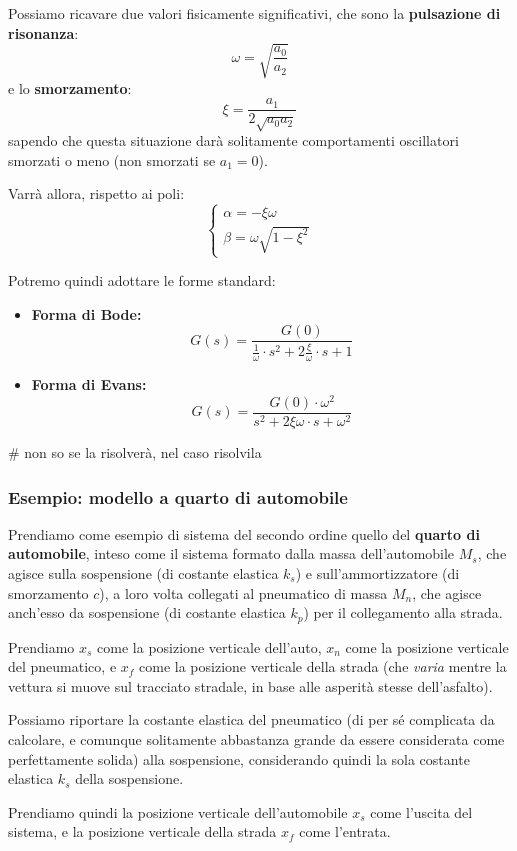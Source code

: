 \documentclass[a4paper,11pt]{article}
\begin{document}
Possiamo ricavare due valori fisicamente significativi, che sono la \textbf{pulsazione di risonanza}:
$$
\omega = \sqrt{\frac{a_0}{a_2}}
$$
e lo \textbf{smorzamento}:
$$
\xi = \frac{a_1}{2 \sqrt{a_0 a_2}}
$$
sapendo che questa situazione darà solitamente comportamenti oscillatori smorzati o meno (non smorzati se $a_1 = 0$).

Varrà allora, rispetto ai poli:
\[
	\begin{cases}
		\alpha = -\xi \omega \\
		\beta = \omega \sqrt{1 - \xi^2}
	\end{cases}
\]

Potremo quindi adottare le forme standard:
\begin{itemize}
	\item \textbf{Forma di Bode:}
$$
G(s) = \frac{ G(0) }{ \frac{1}{\omega} \cdot s^2 + 2 \frac{\xi}{\omega} \cdot s + 1 }
$$
	\item \textbf{Forma di Evans:}
$$
G(s) = \frac{ G(0) \cdot \omega^2 }{ s^2 + 2 \xi \omega \cdot s + \omega^2 }
$$
\end{itemize}

# non so se la risolverà, nel caso risolvila

\subsubsection{Esempio: modello a quarto di automobile}
Prendiamo come esempio di sistema del secondo ordine quello del \textbf{quarto di automobile}, inteso come il sistema formato dalla massa dell'automobile $M_s$, che agisce sulla sospensione (di costante elastica $k_s$) e sull'ammortizzatore (di smorzamento $c$), a loro volta collegati al pneumatico di massa $M_n$, che agisce anch'esso da sospensione (di costante elastica $k_p$) per il collegamento alla strada.

Prendiamo $x_s$ come la posizione verticale dell'auto, $x_n$ come la posizione verticale del pneumatico, e $x_f$ come la posizione verticale della strada (che \textit{varia} mentre la vettura si muove sul tracciato stradale, in base alle asperità stesse dell'asfalto).

Possiamo riportare la costante elastica del pneumatico (di per sé complicata da calcolare, e comunque solitamente abbastanza grande da essere considerata come perfettamente solida) alla sospensione, considerando quindi la sola costante elastica $k_s$ della sospensione.

Prendiamo quindi la posizione verticale dell'automobile $x_s$ come l'uscita del sistema, e la posizione verticale della strada $x_f$ come l'entrata.
\end{document}
